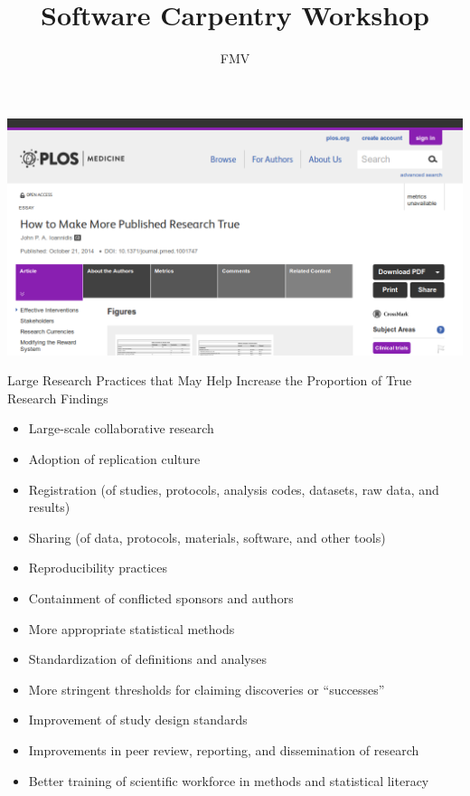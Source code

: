 \documentclass[compress]{beamer}
\title{Software Carpentry Workshop}
\subtitle{FMV}
\date{}
\author{}
\begin{document}

\maketitle

\begin{frame}{}
  \begin{center}
    \vfill
    \includegraphics[scale=.3]{ioannidis-2014.png}
  \end{center}
\end{frame}

\begin{frame}{Large Research Practices that May Help Increase the Proportion of
    True Research Findings}
\small{
\begin{itemize}
\setlength{\itemsep}{1pt}
  \item<1-2> Large-scale collaborative research
  \item<1> Adoption of replication culture
  \item<1> Registration (of studies, protocols, analysis codes, datasets, raw
    data, and results)
  \item<1-2> Sharing (of data, protocols, materials, software, and other tools)
  \item<1-2> Reproducibility practices
  \item<1> Containment of conflicted sponsors and authors
  \item<1-2> More appropriate statistical methods
  \item<1-2> Standardization of definitions and analyses
  \item<1> More stringent thresholds for claiming discoveries or ``successes''
  \item<1> Improvement of study design standards
  \item<1-2> Improvements in peer review, reporting, and dissemination of
    research
  \item<1,3> Better training of scientific workforce in methods and statistical
    literacy
\end{itemize}
}
\end{frame}
\end{document}
